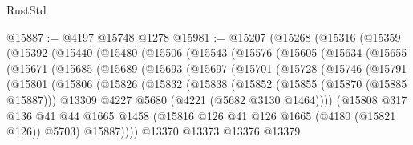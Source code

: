 \begin{lexlean}{RustStd}
\begin{coremodule}
@15887 := @4197 @15748 @1278
@15981 := @15207
    (@15268
      (@15316
        (@15359
          (@15392
            (@15440
              (@15480
                (@15506
                  (@15543
                    (@15576
                      (@15605
                        (@15634
                          (@15655
                            (@15671
                              (@15685
                                (@15689
                                  (@15693
                                    (@15697
                                      (@15701
                                        (@15728
                                          (@15746
                                            (@15791
                                              (@15801
                                                (@15806
                                                  (@15826
                                                    (@15832
                                                      (@15838
                                                        (@15852
                                                          (@15855 (@15870 (@15885 @15887)))
                                                          @13309
                                                          @4227
                                                          @5680
                                                          (@4221 (@5682 @3130 @1464))))
                                                      (@15808
                                                        @317
                                                        @136
                                                        @41
                                                        @44
                                                        @1665
                                                        @1458
                                                        (@15816
                                                          @126
                                                          @41
                                                          @126
                                                          @1665
                                                          (@4180 (@15821 @126))
                                                          @5703)
                                                        @15887))))
                                                @13370
                                                @13373
                                                @13376
                                                @13379

\end{coremodule}
\end{lexlean}
